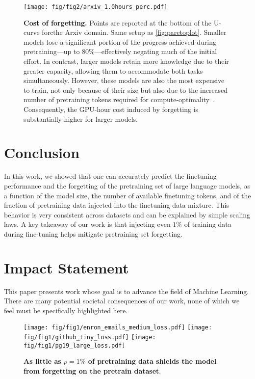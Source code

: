 \begin{figure}[t]
    \centering
    \texttt{[image: fig/fig2/arxiv\_1.0hours\_perc.pdf]}
    \caption{\textbf{Cost of forgetting.} Points are reported at the bottom of the U-curve forcthe Arxiv domain. Same setup as \autoref{fig:paretoplot}. Smaller models lose a significant portion of the progress achieved during pretraining—up to 80\%—effectively negating much of the initial effort. In contrast, larger models retain more knowledge due to their greater capacity, allowing them to accommodate both tasks simultaneously. However, these models are also the most expensive to train, not only because of their size but also due to the increased number of pretraining tokens required for compute-optimality~\citep{DBLP:journals/corr/abs-2203-15556}. Consequently, the GPU-hour cost induced by forgetting is substantially higher for larger models.}
    \label{fig:costlost}
\end{figure}


\section*{Conclusion}
In this work, we showed that one can accurately predict the finetuning performance and the forgetting of the pretraining set of large language models, as a function of the model size, the number of available finetuning tokens, and of the fraction of pretraining data injected into the finetuning data mixture.
This behavior is very consistent across datasets and can be explained by simple scaling laws.
A key takeaway of our work is that injecting even $1\%$ of training data during fine-tuning helps mitigate pretraining set forgetting.

\FloatBarrier 

\newpage
\newpage
\section*{Impact Statement}


This paper presents work whose goal is to advance the field of 
Machine Learning. There are many potential societal consequences 
of our work, none of which we feel must be specifically highlighted here.




\appendix
\onecolumn


\begin{figure*}
    \centering
    \texttt{[image: fig/fig1/enron\_emails\_medium\_loss.pdf]}
    \texttt{[image: fig/fig1/github\_tiny\_loss.pdf]}
    \texttt{[image: fig/fig1/pg19\_large\_loss.pdf]}
    \caption{\textbf{As little as $p=1\%$ of pretraining data shields the model from forgetting on the pretrain dataset}.}
\label{fig:trainingcurveshorizontal}
\end{figure*}



